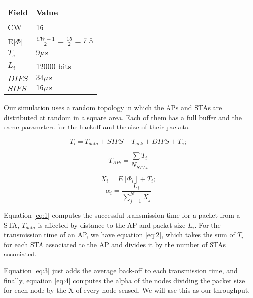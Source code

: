 \documentclass{ article}
\begin{document}
\begin{center}\renewcommand*{\arraystretch}{1.25}
\setlength\tabcolsep{15pt}

\begin{tabular}{|P{1cm}|P{7.25cm}|}


  \hline
  
   \textbf{Field} & \textbf{Value}\\ \hline
  CW & 16 \\\hline
   E[$\Phi$] & $\frac{CW-1}{2}=\frac{15}{2}=7.5$ \\\hline
  $T_e$ & $9 \mu s$\\\hline
  $L_i$ & 12000 bits\\\hline
  $DIFS$ & $34 \mu s$\\\hline
  $SIFS$ & $16 \mu s$\\\hline


\end{tabular}

\end{center}

Our simulation uses a random topology in which the APs and STAs are distributed at random in a square area. Each of them has a full buffer and the same parameters for the backoff and the size of their packets.

\begin{equation}\label{eq:1}
    T_{i}= T_{data} + SIFS + T_{ack} + DIFS + T_e;
\end{equation}

\begin{equation}\label{eq:2}
    T_{APi}=\frac{\sum T_i}{N_{STAi}}
\end{equation}

\begin{equation}\label{eq:3}
   X_i=E[\Phi_i]+T_i;
\end{equation}
\begin{equation}\label{eq:4}
    \alpha_i = \frac{L_i}{\sum_{j=1}^{N} X_{j}}
\end{equation}

Equation \ref{eq:1} computes the successful transmission time for a packet from a STA, $T_{data}$ is affected by distance to the AP and packet size $L_i$. For the transmission time of an AP, we have equation \ref{eq:2}, which takes the sum of $T_i$ for each STA associated to the AP and divides it by the number of STAs associated.

Equation \ref{eq:3} just adds the average back-off to each transmission time, and finally, equation \ref{eq:4} computes the alpha of the nodes dividing the packet size for each node by the X of every node sensed. We will use this as our throughput.
\end{document}
